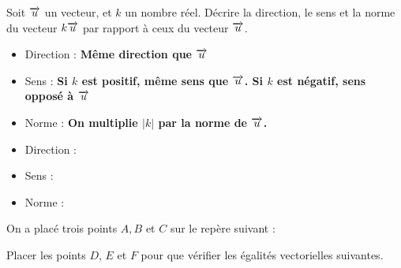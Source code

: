 \documentclass{controle}
\begin{document}
\begin{questions}
\question[3]
Soit $\overrightarrow{u}$ un vecteur, et $k$ un nombre réel. Décrire la direction, le sens et la norme du vecteur $k\overrightarrow{u}$ par rapport à ceux du vecteur $\overrightarrow{u}$.

\ifprintanswers
\begin{itemize}
\item Direction : \textbf{Même direction que $\overrightarrow{u}$} 
\item Sens : \textbf{Si $k$ est positif, même sens que $\overrightarrow{u}$. Si $k$ est négatif, sens opposé à $\overrightarrow{u}$}
\item Norme : \textbf{On multiplie $\left|k\right|$ par la norme de $\overrightarrow{u}$.} 
\end{itemize}
\else
\begin{itemize}
\item Direction :
\item Sens : 
\item Norme :
\end{itemize}
\fi

\question[7]
On a placé trois points $A, B$ et $C$ sur le repère suivant :

\begin{center}
\end{center}
Placer les points $D$, $E$ et $F$ pour que vérifier les égalités vectorielles suivantes.
\end{questions}
\end{document}
